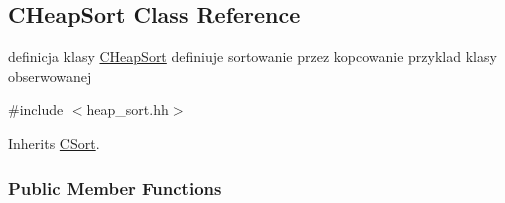 \hypertarget{class_c_heap_sort}{}\subsection{C\+Heap\+Sort Class Reference}
\label{class_c_heap_sort}


definicja klasy \hyperlink{class_c_heap_sort}{C\+Heap\+Sort} definiuje sortowanie przez kopcowanie przyklad klasy obserwowanej  




{\ttfamily \#include $<$heap\+\_\+sort.\+hh$>$}



Inherits \hyperlink{class_c_sort}{C\+Sort}.

\subsubsection*{Public Member Functions}
